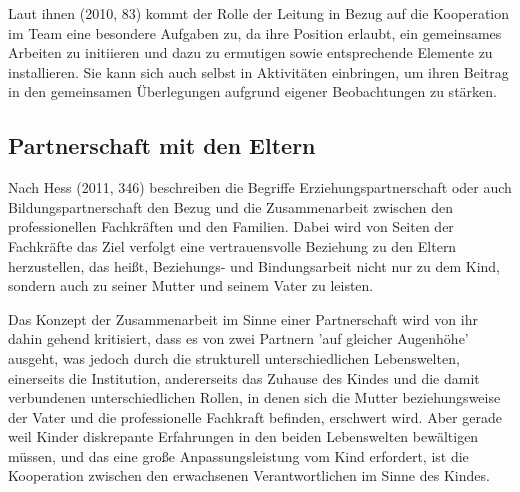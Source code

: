 Laut ihnen (2010, 83) kommt der Rolle der Leitung in Bezug auf die Kooperation im Team eine besondere Aufgaben zu, da ihre Position erlaubt, ein gemeinsames Arbeiten zu initiieren und dazu zu ermutigen sowie entsprechende Elemente zu installieren. Sie kann sich auch selbst in Aktivitäten einbringen, um ihren Beitrag in den gemeinsamen Überlegungen aufgrund eigener Beobachtungen zu stärken.

\subsection{Partnerschaft mit den Eltern}
Nach Hess (2011, 346) beschreiben die Begriffe Erziehungspartnerschaft oder auch Bildungspartnerschaft den Bezug und die Zusammenarbeit zwischen den professionellen Fachkräften und den Familien. Dabei wird von Seiten der Fachkräfte das Ziel verfolgt eine vertrauensvolle Beziehung zu den Eltern herzustellen, das heißt, Beziehungs- und Bindungsarbeit nicht nur zu dem Kind, sondern auch zu seiner Mutter und seinem Vater zu leisten. 

Das Konzept der Zusammenarbeit im Sinne einer Partnerschaft wird von ihr dahin gehend kritisiert, dass es von zwei Partnern 'auf gleicher Augenhöhe' ausgeht, was jedoch durch die strukturell unterschiedlichen Lebenswelten, einerseits die Institution, andererseits das Zuhause des Kindes und die damit verbundenen unterschiedlichen Rollen, in denen sich die Mutter beziehungsweise der Vater und die professionelle Fachkraft befinden, erschwert wird. Aber gerade weil Kinder diskrepante Erfahrungen in den beiden Lebenswelten bewältigen müssen, und das eine große Anpassungsleistung vom Kind erfordert, ist die Kooperation zwischen den erwachsenen Verantwortlichen im Sinne des Kindes. 

